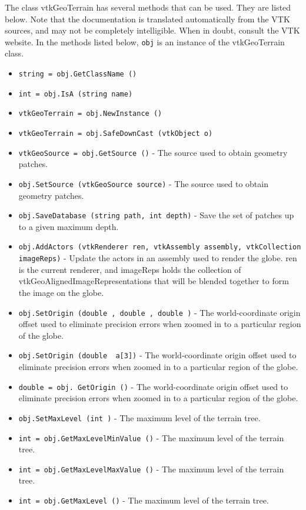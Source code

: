 The class vtkGeoTerrain has several methods that can be used.
  They are listed below.
Note that the documentation is translated automatically from the VTK sources,
and may not be completely intelligible.  When in doubt, consult the VTK website.
In the methods listed below, \verb|obj| is an instance of the vtkGeoTerrain class.
\begin{itemize}
\item  \verb|string = obj.GetClassName ()|

\item  \verb|int = obj.IsA (string name)|

\item  \verb|vtkGeoTerrain = obj.NewInstance ()|

\item  \verb|vtkGeoTerrain = obj.SafeDownCast (vtkObject o)|

\item  \verb|vtkGeoSource = obj.GetSource ()| -  The source used to obtain geometry patches.

\item  \verb|obj.SetSource (vtkGeoSource source)| -  The source used to obtain geometry patches.

\item  \verb|obj.SaveDatabase (string path, int depth)| -  Save the set of patches up to a given maximum depth.

\item  \verb|obj.AddActors (vtkRenderer ren, vtkAssembly assembly, vtkCollection imageReps)| -  Update the actors in an assembly used to render the globe.
 ren is the current renderer, and imageReps holds the collection of
 vtkGeoAlignedImageRepresentations that will be blended together to
 form the image on the globe.

\item  \verb|obj.SetOrigin (double , double , double )| -  The world-coordinate origin offset used to eliminate precision errors
 when zoomed in to a particular region of the globe.

\item  \verb|obj.SetOrigin (double  a[3])| -  The world-coordinate origin offset used to eliminate precision errors
 when zoomed in to a particular region of the globe.

\item  \verb|double = obj. GetOrigin ()| -  The world-coordinate origin offset used to eliminate precision errors
 when zoomed in to a particular region of the globe.

\item  \verb|obj.SetMaxLevel (int )| -  The maximum level of the terrain tree.

\item  \verb|int = obj.GetMaxLevelMinValue ()| -  The maximum level of the terrain tree.

\item  \verb|int = obj.GetMaxLevelMaxValue ()| -  The maximum level of the terrain tree.

\item  \verb|int = obj.GetMaxLevel ()| -  The maximum level of the terrain tree.

\end{itemize}
